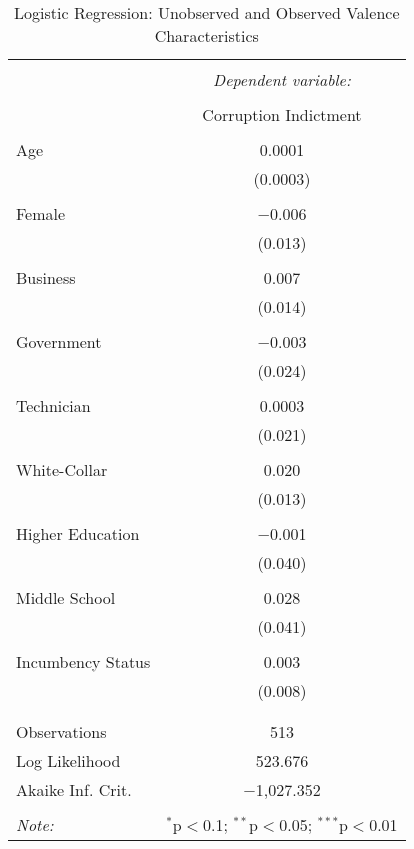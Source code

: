 \documentclass{article}
\begin{document}
\begin{table}[!htbp] \centering 
  \caption{Logistic Regression: Unobserved and Observed Valence Characteristics} 
  \label{} 
\begin{tabular}{@{\extracolsep{5pt}}lc} 
\\[-1.8ex]\hline 
\hline \\[-1.8ex] 
 & \multicolumn{1}{c}{\textit{Dependent variable:}} \\ 
\cline{2-2} 
\\[-1.8ex] & Corruption Indictment \\ 
\hline \\[-1.8ex] 
 Age & 0.0001 \\ 
  & (0.0003) \\ 
  & \\ 
 Female & $-$0.006 \\ 
  & (0.013) \\ 
  & \\ 
 Business & 0.007 \\ 
  & (0.014) \\ 
  & \\ 
 Government & $-$0.003 \\ 
  & (0.024) \\ 
  & \\ 
 Technician & 0.0003 \\ 
  & (0.021) \\ 
  & \\ 
 White-Collar & 0.020 \\ 
  & (0.013) \\ 
  & \\ 
 Higher Education & $-$0.001 \\ 
  & (0.040) \\ 
  & \\ 
 Middle School & 0.028 \\ 
  & (0.041) \\ 
  & \\ 
 Incumbency Status & 0.003 \\ 
  & (0.008) \\ 
  & \\ 
\hline \\[-1.8ex] 
Observations & 513 \\ 
Log Likelihood & 523.676 \\ 
Akaike Inf. Crit. & $-$1,027.352 \\ 
\hline 
\hline \\[-1.8ex] 
\textit{Note:}  & \multicolumn{1}{r}{$^{*}$p$<$0.1; $^{**}$p$<$0.05; $^{***}$p$<$0.01} \\ 
\end{tabular} 
\end{table} 
\end{document}
